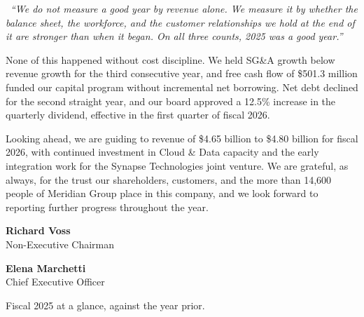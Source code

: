 \documentclass[11pt,oneside,a4paper]{scrbook}
\newcommand{\goldrule}{\noindent{\color{merGold}\rule{\linewidth}{1.1pt}}\par\vspace{2pt}\noindent{\color{merNavy!25}\rule{\linewidth}{0.4pt}}\vspace{10pt}\par}
\newcommand{\sectionlede}[1]{{\color{merSlate}\large #1}\par\vspace{6pt}}
\begin{document}
\begin{pullquote}
{\color{merGold}\faQuoteLeft}\ \textit{``We do not measure a good year by revenue alone. We measure it by whether the balance sheet, the workforce, and the customer relationships we hold at the end of it are stronger than when it began. On all three counts, 2025 was a good year.''}
\end{pullquote}

None of this happened without cost discipline. We held SG\&A growth below revenue growth for the third consecutive year, and free cash flow of \$501.3 million funded our capital program without incremental net borrowing. Net debt declined for the second straight year, and our board approved a 12.5\% increase in the quarterly dividend, effective in the first quarter of fiscal 2026.

Looking ahead, we are guiding to revenue of \$4.65 billion to \$4.80 billion for fiscal 2026, with continued investment in Cloud \& Data capacity and the early integration work for the Synapse Technologies joint venture. We are grateful, as always, for the trust our shareholders, customers, and the more than 14,600 people of Meridian Group place in this company, and we look forward to reporting further progress throughout the year.

\vspace{14pt}
\begin{minipage}[t]{0.46\linewidth}
{\bfseries Richard Voss}\\
Non-Executive Chairman
\end{minipage}\hfill
\begin{minipage}[t]{0.46\linewidth}
{\bfseries Elena Marchetti}\\
Chief Executive Officer
\end{minipage}
\par

\goldrule

\sectionlede{Fiscal 2025 at a glance, against the year prior.}
\end{document}
